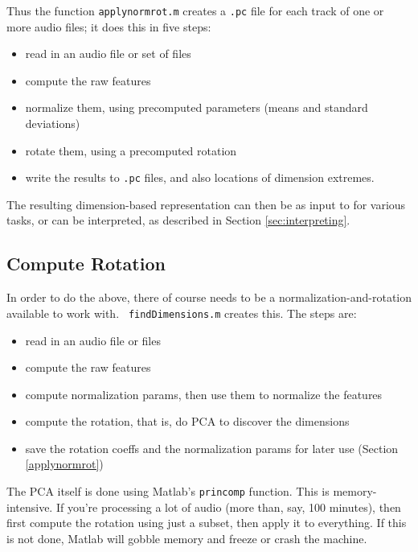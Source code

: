 \documentclass[11pt]{article}
\begin{document}
Thus the function {\tt applynormrot.m} creates a {\tt .pc} file for
each track of one or more audio files; it does this in five steps:
\begin{itemize}   \setlength{\itemsep}{0pt}\setlength{\parskip}{0pt}
\item read in an audio file or set of files
\item compute the raw  features
\item normalize them, using  precomputed parameters (means and
  standard deviations)
\item  rotate them, using a precomputed rotation
\item write the results to {\tt .pc} files, and also locations of dimension
  extremes.
\end{itemize}

The resulting dimension-based representation can then be as input to
for various tasks, or can be interpreted, as described in Section
\ref{sec:interpreting}.


\subsection{Compute Rotation} \label{computerotation}

In order to do the above, there of course needs to be a
normalization-and-rotation available to work with.  {\tt
  findDimensions.m} creates this.  The steps are:
\begin{itemize}   \setlength{\itemsep}{0pt}\setlength{\parskip}{0pt}
\item read in an audio file or files
\item compute the raw  features
\item compute normalization params, then use them to normalize the features
\item compute the rotation, that is, do PCA to discover the dimensions
\item save the rotation coeffs and the normalization params for later use (Section \ref{applynormrot})
\end{itemize}

The PCA itself is done using Matlab's {\tt princomp} function.  This
is memory-intensive.  If you're processing a lot of audio (more than,
say, 100 minutes), then first compute the rotation using just a
subset, then apply it to everything.  If this is not done, Matlab
will gobble memory and freeze or crash the machine.
\end{document}
